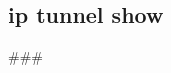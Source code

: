  \subsection*{ip tunnel show}

\#\#\# 
\begin{DoxyCode}{0}
\end{DoxyCode}
 
\begin{DoxyCode}{0}
\end{DoxyCode}
 